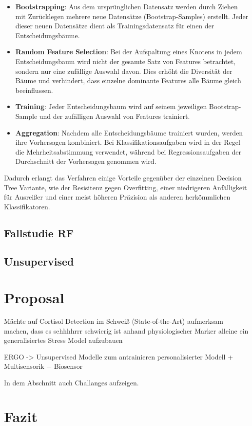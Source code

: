 \begin{itemize}
    \item \textbf{Bootstrapping}: Aus dem ursprünglichen Datensatz werden durch Ziehen mit Zurücklegen mehrere neue Datensätze (Bootstrap-Samples) erstellt. Jeder dieser neuen Datensätze dient als Trainingsdatensatz für einen der Entscheidungsbäume.
    
    \item \textbf{Random Feature Selection}: Bei der Aufspaltung eines Knotens in jedem Entscheidungsbaum wird nicht der gesamte Satz von Features betrachtet, sondern nur eine zufällige Auswahl davon. Dies erhöht die Diversität der Bäume und verhindert, dass einzelne dominante Features alle Bäume gleich beeinflussen.
    
    \item \textbf{Training}: Jeder Entscheidungsbaum wird auf seinem jeweiligen Bootstrap-Sample und der zufälligen Auswahl von Features trainiert.
    
    \item \textbf{Aggregation}: Nachdem alle Entscheidungsbäume trainiert wurden, werden ihre Vorhersagen kombiniert. Bei Klassifikationsaufgaben wird in der Regel die Mehrheitsabstimmung verwendet, während bei Regressionsaufgaben der Durchschnitt der Vorhersagen genommen wird.
\end{itemize}

Dadurch erlangt das Verfahren einige Vorteile gegenüber der einzelnen Decision Tree Variante, wie der Resisitenz gegen Overfitting, einer niedrigeren Anfälligkeit für Ausreißer und einer meist
höheren Präzision als anderen herkömmlichen Klassifikatoren.

\subsection{Fallstudie RF}

\subsection{Unsupervised}


\section{Proposal}
    Mächte auf Cortisol Detection im Schweiß (State-of-the-Art) aufmerksam machen, dass es sehhhhrrr schwierig ist anhand physiologischer Marker alleine ein generalisiertes Stress Model aufzubauen

     ERGO -> Unsupervised Modelle zum antrainieren personalisierter Modell + Multisensorik + Biosensor

    In dem Abschnitt auch Challanges aufzeigen.

\section{Fazit}
    
    
